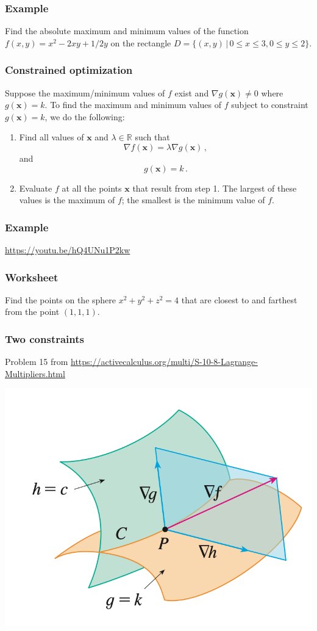\documentclass[aspectratio=169]{beamer}
\begin{document}
\begin{frame}
    \frametitle{Example}
    Find the absolute maximum and minimum values of the function $f(x, y) = x^2 - 2xy + 1/2y$ on the rectangle $D = \{(x, y) \,|\, 0 \leq x \leq 3, 0 \leq y \leq 2\}$.
\end{frame}

\begin{frame}
    \frametitle{Constrained optimization}
    
\begin{theorem}

Suppose the maximum/minimum values of \(f\) exist and \(\nabla g(\mathbf{x}) \not=0\) where \(g(\mathbf{x}) = k\).
To find the maximum and minimum values of \(f\) subject to constraint
\(g(\mathbf{x}) = k\), we do the following:

\begin{enumerate}
\def\labelenumi{\arabic{enumi}.}
\item
  Find all values of \(\mathbf{x}\) and \(\lambda \in \mathbb{R}\) such that
  \begin{equation*}
   \nabla f(\mathbf{x}) =\lambda \nabla g(\mathbf{x})\,,
  \end{equation*}
  and
  \begin{equation*}
   g(\mathbf{x}) = k \,.
  \end{equation*}
\item
  Evaluate \(f\) at all the points \(\mathbf{x}\) that result from step 1. The largest of
  these values is the maximum of \(f\); the smallest is the minimum value of \(f\).
\end{enumerate}

\end{theorem}
\end{frame}

\begin{frame}
    \frametitle{Example}
    \url{https://youtu.be/hQ4UNu1P2kw}
\end{frame}

\begin{frame}
    \frametitle{Worksheet}
         Find the points on the sphere $x^2 + y^2 + z^2 =4$
            that are closest to and farthest from the point 
            $(1,1,1)$.
\end{frame}

\begin{frame}
    \frametitle{Two constraints}
        Problem 15 from \url{https://activecalculus.org/multi/S-10-8-Lagrange-Multipliers.html}

        \includegraphics[scale=0.5]{two-constraints.png}
\end{frame}
\end{document}
